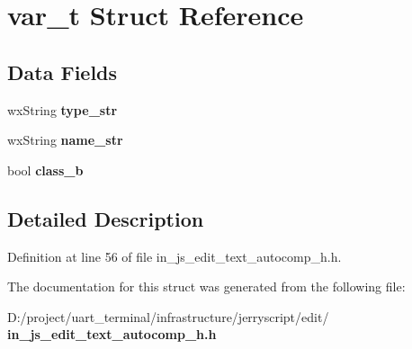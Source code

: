 \section{var\+\_\+t Struct Reference}
\label{structvar__t}
\subsection*{Data Fields}
\begin{DoxyCompactItemize}
\item 
\mbox{\label{structvar__t_a245d32b4991c69cc271aed8dbda4ee40}} 
wx\+String {\bfseries type\+\_\+str}
\item 
\mbox{\label{structvar__t_a4f420117d8c68001f3c555687fee0d84}} 
wx\+String {\bfseries name\+\_\+str}
\item 
\mbox{\label{structvar__t_abc5d506df26fed870be7682ddbcaf9af}} 
bool {\bfseries class\+\_\+b}
\end{DoxyCompactItemize}


\subsection{Detailed Description}


Definition at line 56 of file in\+\_\+js\+\_\+edit\+\_\+text\+\_\+autocomp\+\_\+h.\+h.



The documentation for this struct was generated from the following file\+:\begin{DoxyCompactItemize}
\item 
D\+:/project/uart\+\_\+terminal/infrastructure/jerryscript/edit/\textbf{ in\+\_\+js\+\_\+edit\+\_\+text\+\_\+autocomp\+\_\+h.\+h}\end{DoxyCompactItemize}
